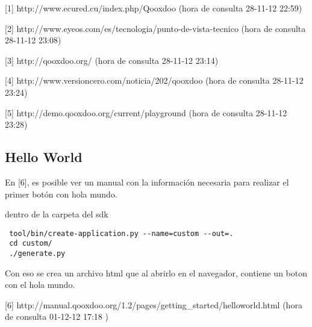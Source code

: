 [1] http://www.ecured.cu/index.php/Qooxdoo (hora de consulta 28-11-12 22:59)

[2] http://www.eyeos.com/es/tecnologia/punto-de-vista-tecnico (hora de consulta 28-11-12 23:08)

[3] http://qooxdoo.org/ (hora de consulta 28-11-12 23:14)

[4] http://www.versioncero.com/noticia/202/qooxdoo (hora de consulta 28-11-12 23:24)

[5] http://demo.qooxdoo.org/current/playground (hora de consulta 28-11-12 23:28)



\subsection{Hello World}
En [6], es posible ver un manual con la información necesaria para realizar el primer botón con hola mundo.

dentro de la carpeta del sdk
\begin{verbatim}
 tool/bin/create-application.py --name=custom --out=.
 cd custom/
 ./generate.py 
\end{verbatim}

Con eso se crea un archivo html que al abrirlo en el navegador, contiene un boton con el hola mundo.



[6] http://manual.qooxdoo.org/1.2/pages/getting\_started/helloworld.html (hora de consulta 01-12-12 17:18 )